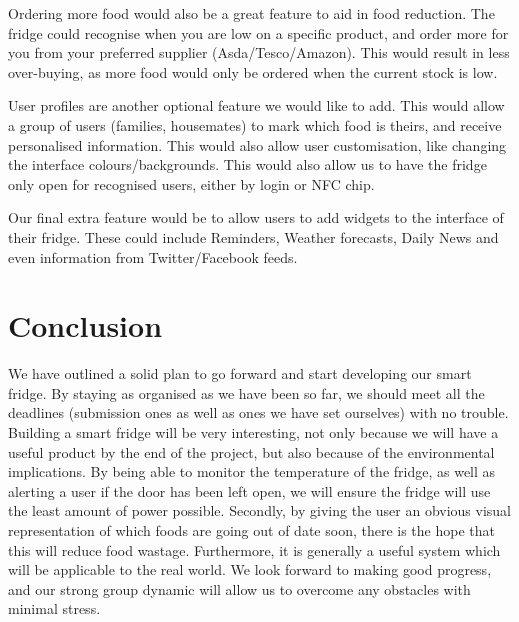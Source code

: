 \documentclass[10pt]{article}
\begin{document}
Ordering more food would also be a great feature to aid in food reduction. The fridge could recognise when you are low on a specific product, and order more for you from your preferred supplier (Asda/Tesco/Amazon). This would result in less over-buying, as more food would only be ordered when the current stock is low.

User profiles are another optional feature we would like to add. This would allow a group of users (families, housemates) to mark which food is theirs, and receive personalised information. This would also allow user customisation, like changing the interface colours/backgrounds. This would also allow us to have the fridge only open for recognised users, either by login or NFC chip.

Our final extra feature would be to allow users to add widgets to the interface of their fridge. These could include Reminders, Weather forecasts, Daily News and even information from Twitter/Facebook feeds. 

\section{Conclusion}

We have outlined a solid plan to go forward and start developing our smart fridge. By staying as organised as we have been so far, we should meet all the deadlines (submission ones as well as ones we have set ourselves) with no trouble. Building a smart fridge will be very interesting, not only because we will have a useful product by the end of the project, but also because of the environmental implications. By being able to monitor the temperature of the fridge, as well as alerting a user if the door has been left open, we will ensure the fridge will use the least amount of power possible. Secondly, by giving the user an obvious visual representation of which foods are going out of date soon, there is the hope that this will reduce food wastage. Furthermore, it is generally a useful system which will be applicable to the real world. We look forward to making good progress, and our strong group dynamic will allow us to overcome any obstacles with minimal stress.
\end{document}
